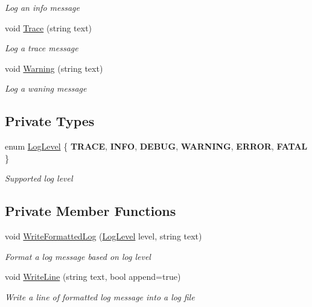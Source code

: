 \begin{DoxyCompactItemize}
\begin{DoxyCompactList}\small\item\em Log an info message \end{DoxyCompactList}\item 
void \hyperlink{class_jcoinche_1_1_tools_1_1_logger_ad1bdc8392d0df9cb110667feed0ef6a0}{Trace} (string text)
\begin{DoxyCompactList}\small\item\em Log a trace message \end{DoxyCompactList}\item 
void \hyperlink{class_jcoinche_1_1_tools_1_1_logger_a33394a0a861c3b7ef6288112f53a06c8}{Warning} (string text)
\begin{DoxyCompactList}\small\item\em Log a waning message \end{DoxyCompactList}\end{DoxyCompactItemize}
\subsection*{Private Types}
\begin{DoxyCompactItemize}
\item 
enum \hyperlink{class_jcoinche_1_1_tools_1_1_logger_ab4fd521c5dbf009c3be7606a842a6e5b}{Log\+Level} \{ \newline
{\bfseries T\+R\+A\+CE}, 
{\bfseries I\+N\+FO}, 
{\bfseries D\+E\+B\+UG}, 
{\bfseries W\+A\+R\+N\+I\+NG}, 
\newline
{\bfseries E\+R\+R\+OR}, 
{\bfseries F\+A\+T\+AL}
 \}\begin{DoxyCompactList}\small\item\em Supported log level \end{DoxyCompactList}
\end{DoxyCompactItemize}
\subsection*{Private Member Functions}
\begin{DoxyCompactItemize}
\item 
void \hyperlink{class_jcoinche_1_1_tools_1_1_logger_a2dc08a5d649ad85fac9cb420c97e9c58}{Write\+Formatted\+Log} (\hyperlink{class_jcoinche_1_1_tools_1_1_logger_ab4fd521c5dbf009c3be7606a842a6e5b}{Log\+Level} level, string text)
\begin{DoxyCompactList}\small\item\em Format a log message based on log level \end{DoxyCompactList}\item 
void \hyperlink{class_jcoinche_1_1_tools_1_1_logger_ac17f4d332af0cc9fadd78f1b4c97a349}{Write\+Line} (string text, bool append=true)
\begin{DoxyCompactList}\small\item\em Write a line of formatted log message into a log file \end{DoxyCompactList}\end{DoxyCompactItemize}
